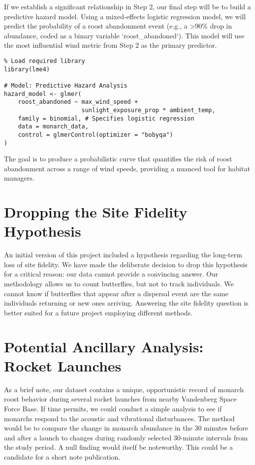 If we establish a significant relationship in Step 2, our final step will be to build a predictive hazard model. Using a mixed-effects logistic regression model, we will predict the probability of a roost abandonment event (e.g., a >90\% drop in abundance, coded as a binary variable `roost_abandoned`). This model will use the most influential wind metric from Step 2 as the primary predictor.

\begin{verbatim}
% Load required library
library(lme4)

# Model: Predictive Hazard Analysis
hazard_model <- glmer(
    roost_abandoned ~ max_wind_speed + 
                      sunlight_exposure_prop * ambient_temp,
    family = binomial, # Specifies logistic regression
    data = monarch_data,
    control = glmerControl(optimizer = "bobyqa")
)
\end{verbatim}

The goal is to produce a probabilistic curve that quantifies the risk of roost abandonment across a range of wind speeds, providing a nuanced tool for habitat managers.

\section{Dropping the Site Fidelity Hypothesis}

An initial version of this project included a hypothesis regarding the long-term loss of site fidelity. We have made the deliberate decision to drop this hypothesis for a critical reason: our data cannot provide a convincing answer. Our methodology allows us to count butterflies, but not to track individuals. We cannot know if butterflies that appear after a dispersal event are the same individuals returning or new ones arriving. Answering the site fidelity question is better suited for a future project employing different methods.

\section{Potential Ancillary Analysis: Rocket Launches}

As a brief note, our dataset contains a unique, opportunistic record of monarch roost behavior during several rocket launches from nearby Vandenberg Space Force Base. If time permits, we could conduct a simple analysis to see if monarchs respond to the acoustic and vibrational disturbances. The method would be to compare the change in monarch abundance in the 30 minutes before and after a launch to changes during randomly selected 30-minute intervals from the study period. A null finding would itself be noteworthy. This could be a candidate for a short note publication.
